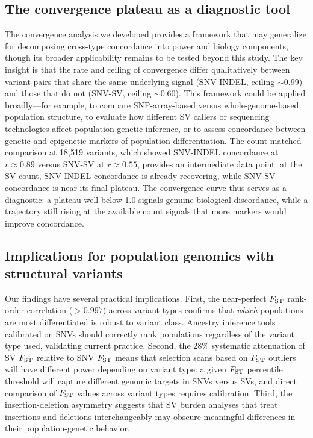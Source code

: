 \subsection*{The convergence plateau as a diagnostic tool}

The convergence analysis we developed provides a framework that may generalize for decomposing cross-type concordance into power and biology components, though its broader applicability remains to be tested beyond this study. The key insight is that the rate and ceiling of convergence differ qualitatively between variant pairs that share the same underlying signal (SNV-INDEL, ceiling $\sim$0.99) and those that do not (SNV-SV, ceiling $\sim$0.60). This framework could be applied broadly---for example, to compare SNP-array-based versus whole-genome-based population structure, to evaluate how different SV callers or sequencing technologies affect population-genetic inference, or to assess concordance between genetic and epigenetic markers of population differentiation. The count-matched comparison at 18,519 variants, which showed SNV-INDEL concordance at $r \approx 0.89$ versus SNV-SV at $r \approx 0.55$, provides an intermediate data point: at the SV count, SNV-INDEL concordance is already recovering, while SNV-SV concordance is near its final plateau. The convergence curve thus serves as a diagnostic: a plateau well below 1.0 signals genuine biological discordance, while a trajectory still rising at the available count signals that more markers would improve concordance.

\subsection*{Implications for population genomics with structural variants}

Our findings have several practical implications. First, the near-perfect $F_\mathrm{ST}$ rank-order correlation ($> 0.997$) across variant types confirms that \emph{which} populations are most differentiated is robust to variant class. Ancestry inference tools calibrated on SNVs should correctly rank populations regardless of the variant type used, validating current practice. Second, the 28\% systematic attenuation of SV $F_\mathrm{ST}$ relative to SNV $F_\mathrm{ST}$ means that selection scans based on $F_\mathrm{ST}$ outliers will have different power depending on variant type: a given $F_\mathrm{ST}$ percentile threshold will capture different genomic targets in SNVs versus SVs, and direct comparison of $F_\mathrm{ST}$ values across variant types requires calibration. Third, the insertion-deletion asymmetry suggests that SV burden analyses that treat insertions and deletions interchangeably may obscure meaningful differences in their population-genetic behavior.

